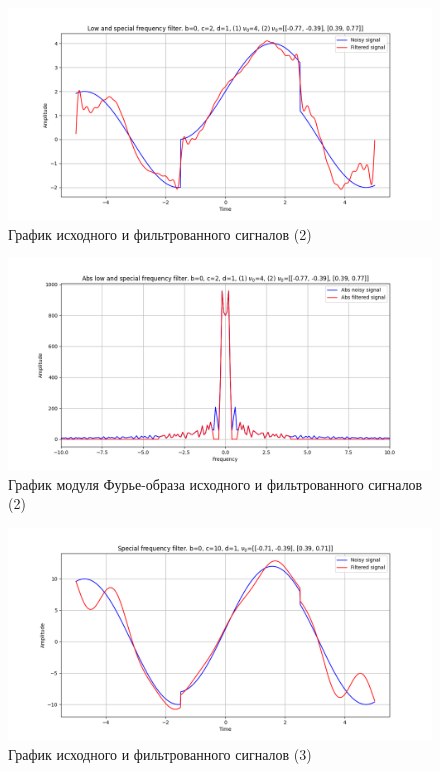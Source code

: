 \documentclass[a4paper, 12pt]{article}
\begin{document}
    \begin{figure}[!htb]
        \centering
        \includegraphics[scale=0.48]{2_3_u_flt_u_nospec.png}
        \captionsetup{skip=0pt}
        \caption{График исходного и фильтрованного сигналов (2)}
        \label{fig:fig87}
    \end{figure}
    \begin{figure}[!htb]
        \centering
        \includegraphics[scale=0.48]{2_3_abs_u_U_nospec.png}
        \captionsetup{skip=0pt}
        \caption{График модуля Фурье-образа исходного и фильтрованного сигналов (2)}
        \label{fig:fig88}
    \end{figure}
    \begin{figure}[!htb]
        \centering
        \includegraphics[scale=0.48]{3_u_flt_u_nospec.png}
        \captionsetup{skip=0pt}
        \caption{График исходного и фильтрованного сигналов (3)}
        \label{fig:fig91}
    \end{figure}
\end{document}
